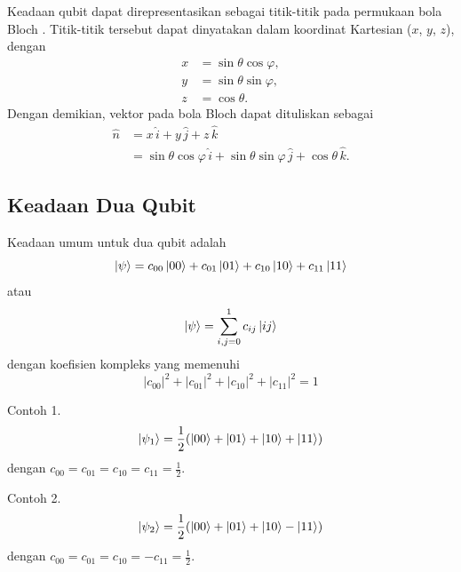 Keadaan qubit dapat direpresentasikan sebagai titik-titik pada permukaan bola Bloch \cite{preskill_notes,Desurvire2009}. Titik-titik tersebut dapat dinyatakan dalam koordinat Kartesian ($x$, $y$, $z$), dengan
\begin{equation}
	\begin{aligned}
		x &= \sin\theta \cos\varphi, \\
		y &= \sin\theta \sin\varphi, \\
		z &= \cos\theta.
	\end{aligned}
\end{equation}
Dengan demikian, vektor pada bola Bloch dapat dituliskan sebagai \cite{pathak2013elements}
\begin{equation}\label{nn}
	\begin{aligned}
		\hat{n} &= x \, \hat{i} + y \, \hat{j} + z \, \hat{k} \\
		&= \sin\theta \cos\varphi \, \hat{i} + \sin\theta \sin\varphi \, \hat{j} + \cos\theta \, \hat{k}.
	\end{aligned}
\end{equation}

\subsection{Keadaan Dua Qubit}
Keadaan umum untuk dua qubit adalah
\begin{equation}
	\ket{\psi}=c_{00}\ket{00}+c_{01}\ket{01}+c_{10}\ket{10}+c_{11}\ket{11} \label{2.16}
\end{equation}
atau
\begin{equation}
	\ket{\psi}=\sum_{i,j=0}^{1} c_{ij} \ket{ij}\label{umum2qubit}
\end{equation}
dengan koefisien kompleks yang memenuhi
\begin{equation}
	|c_{00}|^2+|c_{01}|^2+|c_{10}|^2+|c_{11}|^2=1
\end{equation}

Contoh 1.
\begin{equation}
	\ket{\psi_1}=\frac{1}{2}(\ket{00}+\ket{01}+\ket{10}+\ket{11}) \label{contoh1}
\end{equation}
dengan $c_{00}=c_{01}=c_{10}=c_{11}=\frac{1}{2}$.

Contoh 2.
\begin{equation}
	\ket{\psi_2}=\frac{1}{2}(\ket{00}+\ket{01}+\ket{10}-\ket{11})\label{contohkeadaan2qubit}
\end{equation}
dengan $c_{00}=c_{01}=c_{10}=-c_{11}=\frac{1}{2}$.


